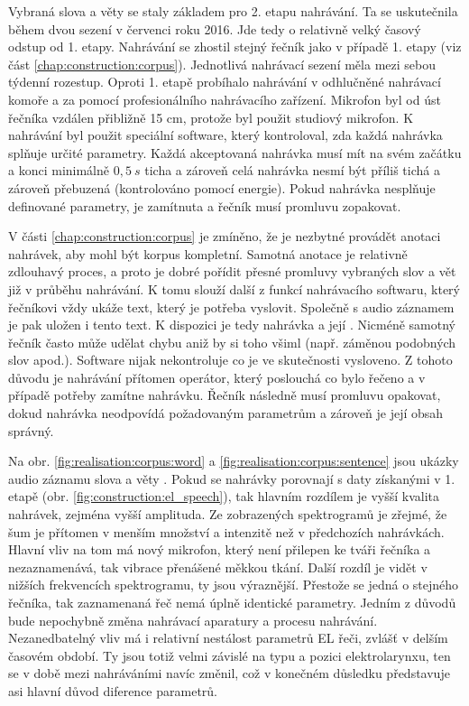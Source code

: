 Vybraná slova a věty se staly základem pro 2. etapu nahrávání. Ta se uskutečnila během dvou sezení v červenci roku 2016. Jde tedy o relativně velký časový odstup od 1. etapy. Nahrávání se zhostil stejný řečník jako v případě 1. etapy (viz část \ref{chap:construction:corpus}). Jednotlivá nahrávací sezení měla mezi sebou týdenní rozestup. Oproti 1. etapě probíhalo nahrávání v odhlučněné nahrávací komoře a za pomocí profesionálního nahrávacího zařízení. Mikrofon byl od úst řečníka vzdálen přibližně 15 cm, protože byl použit studiový mikrofon. K nahrávání byl použit speciální software, který kontroloval, zda každá nahrávka splňuje určité parametry. Každá akceptovaná nahrávka musí mít na svém začátku a konci minimálně $0,5\ s$ ticha a zároveň celá nahrávka nesmí být příliš tichá a zároveň přebuzená (kontrolováno pomocí energie). Pokud nahrávka nesplňuje definované parametry, je zamítnuta a řečník musí promluvu zopakovat.

V části \ref{chap:construction:corpus} je zmíněno, že je nezbytné provádět anotaci nahrávek, aby mohl být korpus kompletní. Samotná anotace je relativně zdlouhavý proces, a proto je dobré pořídit přesné promluvy vybraných slov a vět již v průběhu nahrávání. K tomu slouží další z funkcí nahrávacího softwaru, který řečníkovi vždy ukáže text, který je potřeba vyslovit. Společně s audio záznamem je pak uložen i tento text. K dispozici je tedy nahrávka a její . Nicméně samotný řečník často může udělat chybu aniž by si toho všiml (např. záměnou podobných slov apod.). Software nijak nekontroluje co je ve skutečnosti vysloveno. Z tohoto důvodu je nahrávání přítomen operátor, který poslouchá co bylo řečeno a v případě potřeby zamítne nahrávku. Řečník následně musí promluvu opakovat, dokud nahrávka neodpovídá požadovaným parametrům a zároveň je její obsah správný.

Na obr. \ref{fig:realisation:corpus:word} a \ref{fig:realisation:corpus:sentence} jsou ukázky audio záznamu slova  a věty . Pokud se nahrávky porovnají s daty získanými v 1. etapě (obr. \ref{fig:construction:el_speech}), tak hlavním rozdílem je vyšší kvalita nahrávek, zejména vyšší amplituda. Ze zobrazených spektrogramů je zřejmé, že šum je přítomen v menším množství a intenzitě než v předchozích nahrávkách. Hlavní vliv na tom má nový mikrofon, který není přilepen ke tváři řečníka a nezaznamenává, tak vibrace přenášené měkkou tkání. Další rozdíl je vidět v nižších frekvencích spektrogramu, ty jsou výraznější. Přestože se jedná o stejného řečníka, tak zaznamenaná řeč nemá úplně identické parametry. Jedním z důvodů bude nepochybně změna nahrávací aparatury a procesu nahrávání. Nezanedbatelný vliv má i relativní nestálost parametrů EL řeči, zvlášť v delším časovém období. Ty jsou totiž velmi závislé na typu a pozici elektrolarynxu, ten se v době mezi nahráváními navíc změnil, což v konečném důsledku představuje asi hlavní důvod diference parametrů.

